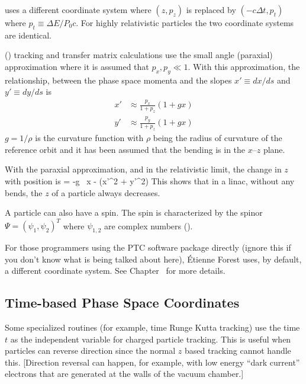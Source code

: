 \mad uses a different coordinate system where $(z, p_z)$ is
replaced by $(-c\Delta t, p_t)$ where $p_t \equiv \Delta E / P_0
c$. For highly relativistic particles the two coordinate systems are
identical.

 () tracking and transfer matrix
calculations use the small angle (paraxial) approximation where it is
assumed that $p_x, p_y \ll 1$. With this approximation, the
relationship, between the phase space momenta and the slopes $x' \equiv
dx/ds$ and $y' \equiv dy/ds$ is
\begin{align}
  x' &\approx \frac{p_x}{1 + p_z} (1 + g x) \\
  y' &\approx \frac{p_y}{1 + p_z} (1 + g x) 
  \label{xpa1p}
\end{align}
$g = 1/\rho$ is the curvature function with $\rho$ being the radius of
curvature of the reference orbit and it has been assumed that the
bending is in the $x$--$z$ plane. 

With the paraxial approximation, and in the relativistic limit, the
change in $z$ with position is
\Begineq
   = -g \, x -  (x'^2 + y'^2)
\Endeq
This shows that in a linac, without any bends, the $z$ of a particle
always decreases.

A particle can also have a spin. The spin is characterized by the
spinor $\Psi = \left( \psi_{1}, \psi_{2} \right)^{T}$ where
$\psi_{1,2}$ are complex numbers ().

For those programmers using the PTC
software package directly (ignore
this if you don't know what is being talked about here), \'Etienne Forest uses,
by default, a different coordinate system. See Chapter~ for more details.

\subsection{Time-based Phase Space Coordinates}
\label{s:time.phase.space}

Some specialized routines (for example, time Runge Kutta tracking) use
the time $t$ as the independent variable for charged particle
tracking. This is useful when particles can reverse direction since the normal
$z$ based tracking cannot handle this. [Direction reversal can happen, for example,
with low energy ``dark current'' electrons that are generated at the
walls of the vacuum chamber.]


